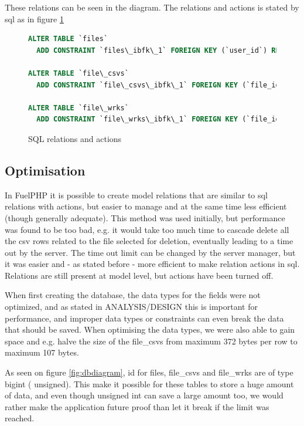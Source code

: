 These relations can be seen in the diagram. The relations and actions is stated by sql as in figure \ref{lst:sql}
\begin{figure}
\begin{lstlisting}[language=sql]
ALTER TABLE `files`
  ADD CONSTRAINT `files\_ibfk\_1` FOREIGN KEY (`user_id`) REFERENCES `users` (`id`) ON DELETE NO ACTION ON UPDATE NO ACTION;

ALTER TABLE `file\_csvs`
  ADD CONSTRAINT `file\_csvs\_ibfk\_1` FOREIGN KEY (`file_id`) REFERENCES `files` (`id`) ON DELETE CASCADE ON UPDATE NO ACTION;

ALTER TABLE `file\_wrks`
  ADD CONSTRAINT `file\_wrks\_ibfk\_1` FOREIGN KEY (`file_id`) REFERENCES `files` (`id`) ON DELETE CASCADE ON UPDATE NO ACTION;
\end{lstlisting}
\caption{SQL relations and actions}
\label{lst:sql}
\end{figure}

\subsection{Optimisation}
In FuelPHP it is possible to create model relations that are similar to sql relations with actions, but easier to manage and at the same time less efficient (though generally adequate). This method was used initially, but performance was found to be too bad, e.g. it would take too much time to cascade delete all the csv rows related to the file selected for deletion, eventually leading to a time out by the server. The time out limit can be changed by the server manager, but it was easier and - as stated before - more efficient to make relation actions in sql. Relations are still present at model level, but actions have been turned off.

When first creating the database, the data types for the fields were not optimized, and as stated in ANALYSIS/DESIGN this is important for performance, and improper data types or constraints can even break the data that should be saved. When optimising the data types, we were also able to gain space and e.g. halve the size of the \textsf{file\_csvs} from maximum 372 bytes per row to maximum 107 bytes.

As seen on figure \ref{fig:dbdiagram}, \textsf{id} for  \textsf{files, file\_csvs} and  \textsf{file\_wrks} are of type \textsf{bigint} ( \textsf{unsigned}). This make it possible for these tables to store a huge amount of data, and even though \textsf{unsigned int} can save a large amount too, we would rather make the application future proof than let it break if the limit was reached.

